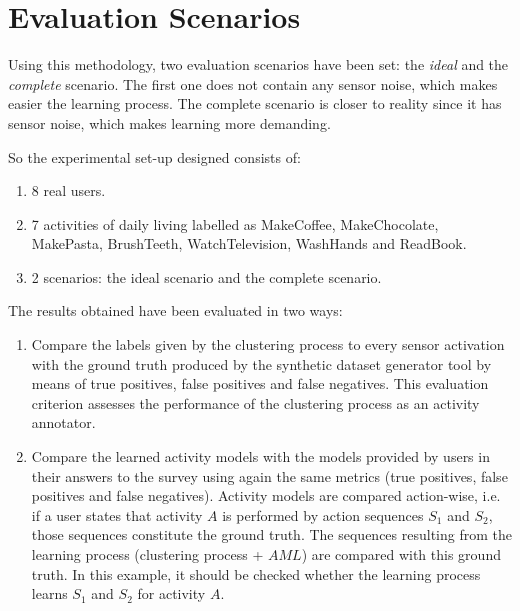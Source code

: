 \section{Evaluation Scenarios}
\label{sec:evaluation:scenarios}

Using this methodology, two evaluation scenarios have been set: the \textit{ideal} and the \textit{complete} scenario. The first one does not contain any sensor noise, which makes easier the learning process. The complete scenario is closer to reality since it has sensor noise, which makes learning more demanding.

So the experimental set-up designed consists of: 

\begin{enumerate}
 \item 8 real users.
 \item 7 activities of daily living labelled as MakeCoffee, MakeChocolate, MakePasta, BrushTeeth, WatchTelevision, WashHands and ReadBook. 
 \item 2 scenarios: the ideal scenario and the complete scenario.
\end{enumerate}

The results obtained have been evaluated in two ways: 

\begin{enumerate}
 \item Compare the labels given by the clustering process to every sensor activation with the ground truth produced by the synthetic dataset generator tool by means of true positives, false positives and false negatives. This evaluation criterion assesses the performance of the clustering process as an activity annotator.
 \item Compare the learned activity models with the models provided by users in their answers to the survey using again the same metrics (true positives, false positives and false negatives). Activity models are compared action-wise, i.e. if a user states that activity $A$ is performed by action sequences $S_1$ and $S_2$, those sequences constitute the ground truth. The sequences resulting from the learning process (clustering process + $AML$) are compared with this ground truth. In this example, it should be checked whether the learning process learns $S_1$ and $S_2$ for activity $A$.
\end{enumerate}